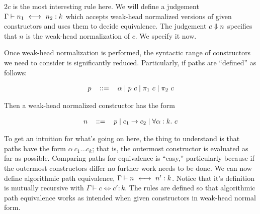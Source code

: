 \documentclass{amsart}
\newcommand{\type}{\ensuremath{\mathtt{type}}}
\begin{document}
$2c$ is the most interesting rule here. We will define a judgement $\Gamma
\vdash n_1 \ \longleftrightarrow\  n_2 : k$ which accepts weak-head normalized versions of given
constructors and uses them to decide equivalence. The judgement $c \Downarrow n$
specifies that $n$ is the weak-head normalization of $c$. We specify it now.


Once weak-head normalization is performed, the syntactic range of constructors
we need to consider is significantly reduced. Particularly, if paths are
``defined'' as follows:

\[
\begin{tabular}{lcl}
    $p$ & $::=$ & $\alpha \mid p \ c \mid \pi_1 \ c \mid \pi_2 \ c$
\end{tabular}
\]

Then a weak-head normalized constructor has the form

\[
    \begin{tabular}{lcl}
        $n$ & $::=$ & $p \mid c_1 \to c_2 \mid \forall \alpha : k. \ c$
    \end{tabular}
\]

To get an intuition for what's going on here, the thing to understand is that
paths have the form $\alpha \ c_1 \dots c_k$; that is, the outermost constructor
is evaluated as far as possible. Comparing paths for equivalence is ``easy,''
particularly because if the outermost constructors differ no further work needs
to be done. We can now define algorithmic path equivalence, $\Gamma \vdash n
\ \longleftrightarrow\  n' : k$. Notice that it's definition is mutually recursive with $\Gamma
\vdash c \iff c' : k$. The rules are defined so that algorithmic path
equivalence works as intended when given constructors in weak-head normal form.

\end{document}
